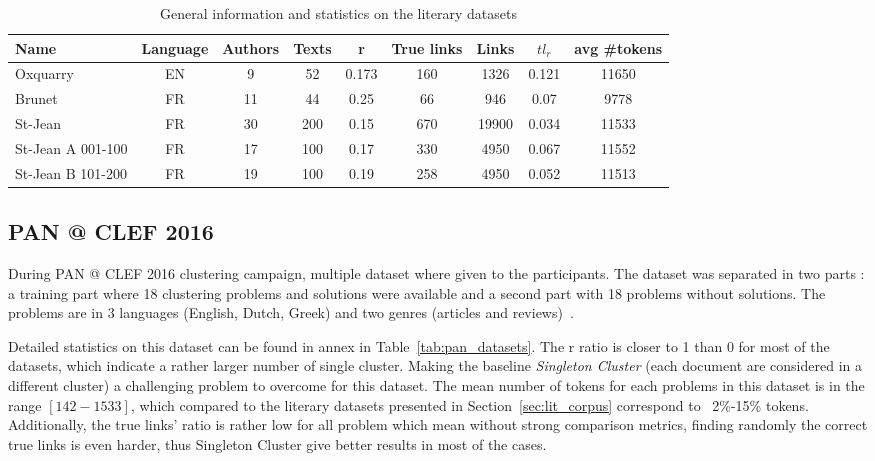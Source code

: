 \begin{table*}[]
  \centering
  \caption{General information and statistics on the literary datasets}
  \label{tab:lit_datasets}
  \begin{tabular}{ l c c c c c c c c }
    \toprule
    \textbf{Name} &
    \textbf{Language} &
    \textbf{Authors} &
    \textbf{Texts} &
    \textbf{r} &
    \textbf{True links} &
    \textbf{Links} &
    \textbf{$tl_r$} &
    \textbf{avg \#tokens} \\
    \midrule
    Oxquarry & EN & 9 & 52 & 0.173 & 160 & 1326 & 0.121 & 11650 \\
    Brunet & FR & 11 & 44 & 0.25 & 66 & 946 & 0.07 & 9778 \\
    St-Jean & FR & 30 & 200 & 0.15 & 670 & 19900 & 0.034 & 11533 \\
    St-Jean A 001-100 & FR & 17 & 100 & 0.17 & 330 & 4950 & 0.067 & 11552 \\
    St-Jean B 101-200 & FR & 19 & 100 & 0.19 & 258 & 4950 & 0.052 & 11513 \\
    \bottomrule
  \end{tabular}
\end{table*}


\subsection{PAN @ CLEF 2016}

During PAN @ CLEF 2016 clustering campaign, multiple dataset where given to the participants.
The dataset was separated in two parts : a training part where 18 clustering problems and solutions were available and a second part with 18 problems without solutions.
The problems are in 3 languages (English, Dutch, Greek) and two genres (articles and reviews)~\cite{pan16}.

Detailed statistics on this dataset can be found in annex in Table~\ref{tab:pan_datasets}.
The r ratio is closer to 1 than 0 for most of the datasets, which indicate a rather larger number of single cluster.
Making the baseline \textit{Singleton Cluster} (each document are considered in a different cluster) a challenging problem to overcome for this dataset.
The mean number of tokens for each problems in this dataset is in the range $[142-1533]$, which compared to the literary datasets presented in Section~\ref{sec:lit_corpus} correspond to ~2\%-15\% tokens.
Additionally, the true links' ratio is rather low for all problem which mean without strong comparison metrics, finding randomly the correct true links is even harder, thus Singleton Cluster give better results in most of the cases.
